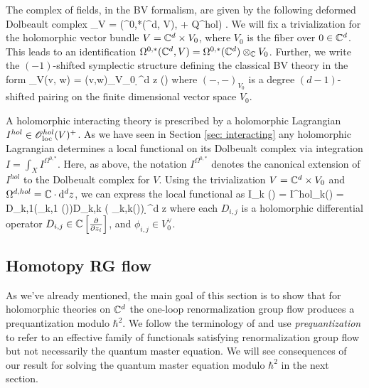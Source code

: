\documentclass[11pt]{amsart}
\begin{document}
The complex of fields, in the BV formalism, are given by the following deformed Dolbeault complex
\ben
\sE_V = \left(\Omega^{0,*}(\CC^d, V), \dbar + Q^{hol}\right) .
\een
We will fix a trivialization for the holomorphic vector bundle $V = \mathbb C^d \times V_0$, where $V_0$ is the fiber over $0 \in \mathbb C^d$.
This leads to an identification $\Omega^{0,*}(\mathbb C^d , V) = \Omega^{0,*}(\mathbb C^d) \otimes_\mathbb C V_0$.
Further, we write the $(-1)$-shifted symplectic structure defining the classical BV theory in the form
\ben
\omega_V(\alpha \tensor v, \beta \tensor w) = (v,w)_{V_0} \int \d^d z (\alpha \wedge \beta)
\een
where $(-,-)_{V_0}$ is a degree $(d-1)$-shifted pairing on the finite dimensional vector space $V_0$. 

A holomorphic interacting theory is prescribed by a holomorphic Lagrangian $I^{hol} \in \mathscr O_{\rm loc}^{hol}(V)^+$. 
As we have seen in Section \ref{sec: interacting} any holomorphic Lagrangian determines a local functional on its Dolbeualt complex via integration $I = \int_X I^{\Omega^{0,*}}$. 
Here, as above, the notation $I^{\Omega^{0,*}}$ denotes the canonical extension of $I^{hol}$ to the Dolbeualt complex for $V$. 
Using the trivialization $V = \mathbb C^d \times V_0$ and $\Omega^{d,hol} = \mathbb C \cdot {\rm d}^d z$, we can express the local functional as
\ben
I_k (\alpha) = \int I^{hol}_k(\alpha) = \int D_{k,1}(\phi_{k,1} (\alpha))\cdots D_{k,k} ( \phi_{k,k}(\alpha)) \d^d z 
\een
where each $D_{i,j}$ is a holomorphic differential operator $D_{i,j} \in \mathbb C\left[\frac{\partial}{\partial z_i}\right]$, and $\phi_{i,j} \in V_0^\vee$.



\subsection{Homotopy RG flow}

As we've already mentioned, the main goal of this section is to show that for holomorphic theories on $\mathbb C^d$ the one-loop renormalization group flow produces a prequantization modulo $\hbar^2$. 
We follow the terminology of \cite{CosRenorm} and use {\em prequantization} to refer to an effective family of functionals satisfying renormalization group flow but not necessarily the quantum master equation. 
We will see consequences of our result for solving the quantum master equation modulo $\hbar^2$ in the next section.  
\end{document}
